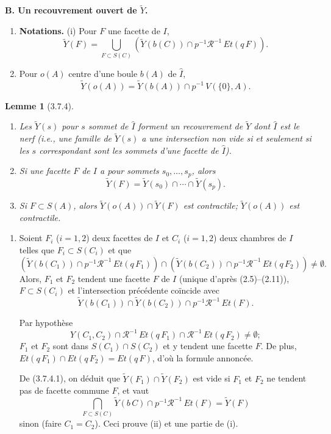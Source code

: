 \documentclass[12pt]{article}
\newtheorem{lemme}[theoreme]{Lemme}
\theoremstyle{remark}
\begin{document}
\textbf{B. Un recouvrement ouvert de $\tilde{Y}$.}

\begin{enumerate}
\item[(3.7.3)] \textbf{Notations.} (i) Pour $F$ une facette de $I$,
\[\tilde{Y}(F) = \bigcup_{F \subset S(C)} (\tilde{Y}(b(C)) \cap p^{-1} \mathscr{R}^{-1} \, Et(q \, F)).\]
\item[(ii)] Pour $o(A)$ centre d'une boule $b(A)$ de $\hat{I}$,
\[\tilde{Y}(o(A)) = \tilde{Y}(b(A)) \cap p^{-1} \, V(\{0\}, A).\]
\end{enumerate}

\begin{lemme}[3.7.4]
\begin{enumerate}
\item[(i)] Les $\tilde{Y}(s)$ pour $s$ sommet de $\hat{I}$ forment un \emph{recouvrement} de $\tilde{Y}$ dont $\hat{I}$ est le \emph{nerf} (i.e., une famille de $\tilde{Y}(s)$ a une intersection non vide si et seulement si les $s$ correspondant sont les sommets d'une facette de $\hat{I}$).
\item[(ii)] Si une facette $F$ de $I$ a pour sommets $s_0, \ldots, s_p$, alors
\[\tilde{Y}(F) = \tilde{Y}(s_0) \cap \cdots \cap \tilde{Y}(s_p).\]
\item[(iii)] Si $F \subset S(A)$, alors $\tilde{Y}(o(A)) \cap \tilde{Y}(F)$ est contractile; $\tilde{Y}(o(A))$ est contractile.
\end{enumerate}
\end{lemme}

\begin{enumerate}
\item[(3.7.4.1)] Soient $F_i$ ($i = 1, 2$) deux facettes de $I$ et $C_i$ ($i = 1, 2$) deux chambres de $I$ telles que $F_i \subset S(C_i)$ et que
\[(\tilde{Y}(b(C_1)) \cap p^{-1} \mathscr{R}^{-1} \, Et(q \, F_1)) \cap (\tilde{Y}(b(C_2)) \cap p^{-1} \mathscr{R}^{-1} \, Et(q \, F_2)) \neq \emptyset.\]
Alors, $F_1$ et $F_2$ tendent une facette $F$ de $I$ (unique d'après (2.5)--(2.11)), $F \subset S(C_i)$ et l'intersection précédente coïncide avec
\[\tilde{Y}(b(C_1)) \cap \tilde{Y}(b(C_2)) \cap p^{-1} \mathscr{R}^{-1} \, Et(F).\]

Par hypothèse
\[Y(C_1, C_2) \cap \mathscr{R}^{-1} \, Et(q \, F_1) \cap \mathscr{R}^{-1} \, Et(q \, F_2) \neq \emptyset;\]
$F_1$ et $F_2$ sont dans $S(C_1) \cap S(C_2)$ et y tendent une facette $F$. De plus, $Et(q \, F_1) \cap Et(q \, F_2) = Et(q \, F)$, d'où la formule annoncée.

De (3.7.4.1), on déduit que $\tilde{Y}(F_1) \cap \tilde{Y}(F_2)$ est vide si $F_1$ et $F_2$ ne tendent pas de facette commune $F$, et vaut
\[\bigcap_{F \subset S(C)} \tilde{Y}(b \, C) \cap p^{-1} \mathscr{R}^{-1} \, Et(F) = \tilde{Y}(F)\]
sinon (faire $C_1 = C_2$). Ceci prouve (ii) et une partie de (i).
\end{enumerate}
\end{document}
